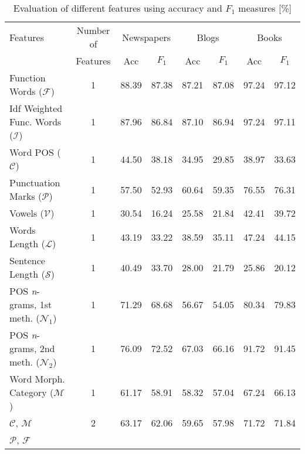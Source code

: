 \documentclass{llncs}
\begin{document}
\begin{table*}[htb]
\normalsize\caption{Evaluation of different features using accuracy and $F_1$ measures [\%]}
\scriptsize
\centering
\begin{tabular}{l c c c c c c c}%
\toprule%
Features & Number of & \multicolumn{2}{c}{Newspapers} &
\multicolumn{2}{c}{Blogs} & \multicolumn{2}{c}{Books}\\ & Features & \hspace{5pt} Acc
\hspace{5pt} & \hspace{5pt} $F_1$ \hspace{5pt} & \hspace{5pt} Acc \hspace{5pt} & \hspace{5pt} $F_1$ \hspace{5pt} & \hspace{5pt} Acc \hspace{5pt} & \hspace{5pt} $F_1$ \hspace{5pt}\\
\midrule
Function Words ($\mathcal{F}$) & 1 & 88.39 & 87.38 & 87.21 & 87.08 & 97.24 &
97.12 \\ Idf Weighted Func. Words ($\mathcal{I}$) & 1 & 87.96 & 86.84 & 87.10
& 86.94 & 97.24 & 97.11 \\ Word POS ($\mathcal{C}$) & 1 & 44.50 & 38.18 & 34.95
& 29.85 & 38.97 & 33.63 \\ Punctuation Marks ($\mathcal{P}$) & 1 & 57.50 & 52.93
& 60.64 & 59.35 & 76.55 & 76.31 \\ Vowels ($\mathcal{V}$) & 1 & 30.54 & 16.24 &
25.58 & 21.84 & 42.41 & 39.72 \\ Words Length ($\mathcal{L}$) & 1 & 43.19 &
33.22 & 38.59 & 35.11 & 47.24 & 44.15 \\ Sentence Length ($\mathcal{S}$) & 1 &
40.49 & 33.70 & 28.00 & 21.79 & 25.86 & 20.12 \\ POS \emph{n}-grams, 1st
meth. ($\mathcal{N}_1$) & 1 & 71.29 & 68.68 & 56.67 & 54.05 & 80.34 & 79.83 \\
POS \emph{n}-grams, 2nd meth. ($\mathcal{N}_2$) & 1 & 76.09 & 72.52 & 67.03 &
66.16 & 91.72 & 91.45 \\ Word Morph. Category ($\mathcal{M}$) & 1 & 61.17
& 58.91 & 58.32 & 57.04 & 67.24 & 66.13 \\ $\mathcal{C}$, $\mathcal{M}$ & 2 &
63.17 & 62.06 & 59.65 & 57.98 & 71.72 & 71.84 \\ $\mathcal{P}$, $\mathcal{F}$ &

\end{tabular}
\end{table*}
\end{document}
